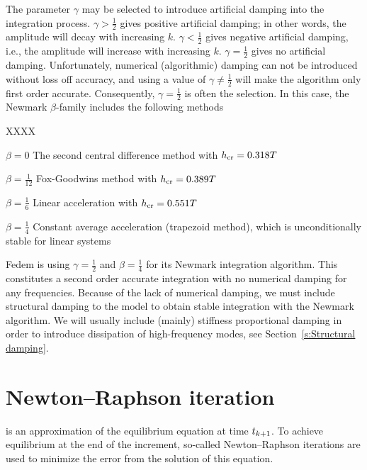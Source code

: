 The parameter $\gamma$ may be selected to introduce artificial damping into the
integration process.
$\gamma > \frac{1}{2}$ gives positive artificial damping; in other words,
the amplitude will decay with increasing $k$.
$\gamma < \frac{1}{2}$ gives negative artificial damping, i.e.,
the amplitude will increase with increasing $k$.
$\gamma = \frac{1}{2}$ gives no artificial damping.
Unfortunately, numerical (algorithmic) damping can not be introduced without
loss off accuracy, and using a value of $\gamma\neq\frac{1}{2}$ will make the
algorithm only first order accurate.
Consequently, $\gamma=\frac{1}{2}$ is often the selection.
In this case, the Newmark $\beta$-family includes the following methods
%
\begin{namelist}{XXXX}
\item[$\beta=0$] The second central difference method with $h_{\rm cr} = 0.318T$
\item[$\beta=\frac{1}{12}$] Fox-Goodwins method with $h_{\rm cr} = 0.389T$
\item[$\beta=\frac{1}{6}$] Linear acceleration with $h_{\rm cr} = 0.551T$
\item[$\beta=\frac{1}{4}$] Constant average acceleration (trapezoid method),
which is unconditionally stable for linear systems
\end{namelist}

Fedem is using $\gamma=\frac{1}{2}$ and $\beta=\frac{1}{4}$ for its Newmark
integration algorithm.
This constitutes a second order accurate integration with no numerical damping
for any frequencies.
Because of the lack of numerical damping, we must include structural damping to
the model to obtain stable integration with the Newmark algorithm.
We will usually include (mainly) stiffness proportional damping in order to
introduce dissipation of high-frequency modes, see
Section~\ref{s:Structural damping}.

\section{Newton--Raphson iteration}
\label{s:Newton-Raphson iteration}

 is an approximation of the equilibrium equation at time $t_\kp1$.
To achieve equilibrium at the end of the increment, so-called Newton--Raphson
iterations are used to minimize the error from the solution of this equation.

